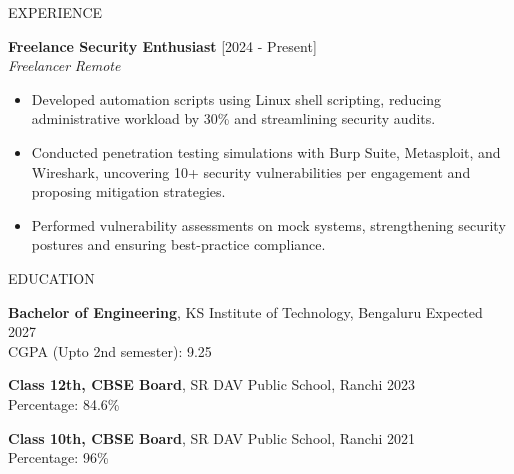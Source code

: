 \documentclass{resume} %
\begin{document}
\begin{rSection}{EXPERIENCE}

    \textbf{Freelance Security Enthusiast} \hfill [2024 - Present] \\
    \textit{Freelancer} \vspace{0.1em} \hfill \textit{Remote}
    \begin{itemize}
        \itemsep -3pt
        \item Developed automation scripts using Linux shell scripting, reducing administrative workload by 30\% and streamlining security audits.
        \item Conducted penetration testing simulations with Burp Suite, Metasploit, and Wireshark, uncovering 10+ security vulnerabilities per engagement and proposing mitigation strategies.
        \item Performed vulnerability assessments on mock systems, strengthening security postures and ensuring best-practice compliance.
    \end{itemize}

\end{rSection}

\vspace{0.5em}


\begin{rSection}{EDUCATION}

    \textbf{Bachelor of Engineering}, KS Institute of Technology, Bengaluru \hfill Expected 2027 \\
    CGPA (Upto 2nd semester): 9.25
    \vspace{0.2em}

    \textbf{Class 12th, CBSE Board}, SR DAV Public School, Ranchi \hfill 2023 \\
    Percentage: 84.6\%
    \vspace{0.2em}

    \textbf{Class 10th, CBSE Board}, SR DAV Public School, Ranchi \hfill 2021 \\
    Percentage: 96\%
    
\end{rSection}

\vspace{0.5em}

\end{document}
